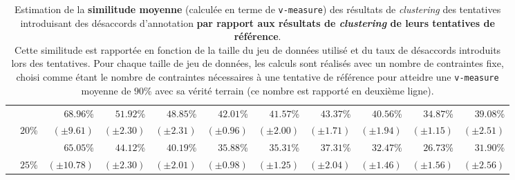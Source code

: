 \begin{table}[!htb]
\begin{center}
{\begin{tabular}{|c|c||r|r|r|r|r|r|r|r|r|}
						\cellcolor{colorTableHeader!15}
							& \cellcolor{colorTableHeader!15}
							& $68.96$\%
							& $51.92$\%
							& $48.85$\%
							& $42.01$\%
							& $41.57$\%
							& $43.37$\%
							& $40.56$\%
							& $34.87$\%
							& $39.08$\%
							\tabularnewline
						\cellcolor{colorTableHeader!15}
							& \multirow{-2}{*}{
								\cellcolor{colorTableHeader!15}
								$20$\%
							}
							& \footnotesize $(\pm9.61)$
							& \footnotesize $(\pm2.30)$
							& \footnotesize $(\pm2.31)$
							& \footnotesize $(\pm0.96)$
							& \footnotesize $(\pm2.00)$
							& \footnotesize $(\pm1.71)$
							& \footnotesize $(\pm1.94)$
							& \footnotesize $(\pm1.15)$
							& \footnotesize $(\pm2.51)$
							\tabularnewline
							\hhline{~----------}
						
						\cellcolor{colorTableHeader!15}
							& \cellcolor{colorTableHeader!15}
							& $65.05$\%
							& $44.12$\%
							& $40.19$\%
							& $35.88$\%
							& $35.31$\%
							& $37.31$\%
							& $32.47$\%
							& $26.73$\%
							& $31.90$\%
							\tabularnewline
						\multirow{-12}{*}{
							\cellcolor{colorTableHeader!15}
							\rotatebox[origin=c]{90}{Taux de désaccords simulés}
						}
							& \multirow{-2}{*}{
								\cellcolor{colorTableHeader!15}
								$25$\%
							}
							& \footnotesize $(\pm10.78)$
							& \footnotesize $(\pm2.30)$
							& \footnotesize $(\pm2.01)$
							& \footnotesize $(\pm0.98)$
							& \footnotesize $(\pm1.25)$
							& \footnotesize $(\pm2.04)$
							& \footnotesize $(\pm1.46)$
							& \footnotesize $(\pm1.56)$
							& \footnotesize $(\pm2.56)$
							\tabularnewline
							\hline
						
					\end{tabular}
				}
				\end{center}
				\caption{
					Estimation de la \textbf{similitude moyenne} (calculée en terme de \texttt{v-measure}) des résultats de \textit{clustering} des tentatives introduisant des désaccords d'annotation \textbf{par rapport aux résultats de \textit{clustering} de leurs tentatives de référence}. \\
					Cette similitude est rapportée en fonction de la taille du jeu de données utilisé et du taux de désaccords introduits lors des tentatives.
					Pour chaque taille de jeu de données, les calculs sont réalisés avec un nombre de contraintes fixe, choisi comme étant le nombre de contraintes nécessaires à une tentative de référence pour atteidre une \texttt{v-measure} moyenne de $90$\% avec sa vérité terrain (ce nombre est rapporté en deuxième ligne).
				}
				\label{table:4.6.3-ETUDE-ROBUSTESSE-SUBJECTIVITE-ANNOTATION-ET-DIVERGENCE-CLUSTERING}
			\end{table}

